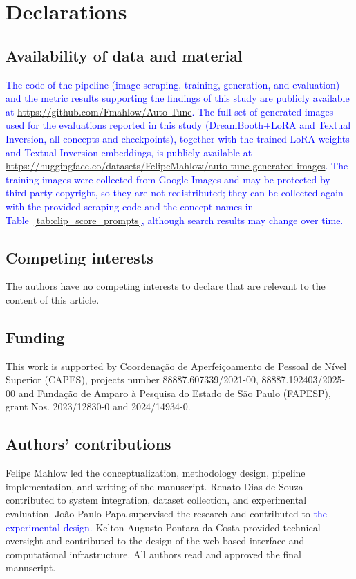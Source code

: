\documentclass[pdflatex,sn-mathphys-num]{sn-jnl}%
\theoremstyle{thmstyleone}%
\theoremstyle{thmstyletwo}%
\theoremstyle{thmstylethree}%
\begin{document}
\section{Declarations}

\subsection*{Availability of data and material}
\textcolor{blue}{The code of the pipeline (image scraping, training, generation, and evaluation) and the metric results supporting the findings of this study are publicly available at \url{https://github.com/Fmahlow/Auto-Tune}. The full set of generated images used for the evaluations reported in this study (DreamBooth+LoRA and Textual Inversion, all concepts and checkpoints), together with the trained LoRA weights and Textual Inversion embeddings, is publicly available at \url{https://huggingface.co/datasets/FelipeMahlow/auto-tune-generated-images}. The training images were collected from Google Images and may be protected by third-party copyright, so they are not redistributed; they can be collected again with the provided scraping code and the concept names in Table~\ref{tab:clip_score_prompts}, although search results may change over time.}

\subsection*{Competing interests}
The authors have no competing interests to declare that are relevant to the content of this article.

\subsection*{Funding}
This work is supported by Coordena\c{c}{\~a}o de Aperfei\c{c}oamento de Pessoal de N{\'i}vel Superior (CAPES), projects number 88887.607339/2021-00, 88887.192403/2025-00  and Funda\c{c}{\~a}o de Amparo {\`a} Pesquisa do Estado de S{\~a}o Paulo (FAPESP), grant Nos. 2023/12830-0 and 2024/14934-0.

\subsection*{Authors' contributions}
Felipe Mahlow led the conceptualization, methodology design, pipeline implementation, and writing of the manuscript. Renato Dias de Souza contributed to system integration, dataset collection, and experimental evaluation. João Paulo Papa supervised the research and contributed to \textcolor{blue}{the experimental design.} Kelton Augusto Pontara da Costa provided technical oversight and contributed to the design of the web-based interface and computational infrastructure. All authors read and approved the final manuscript.
\end{document}
